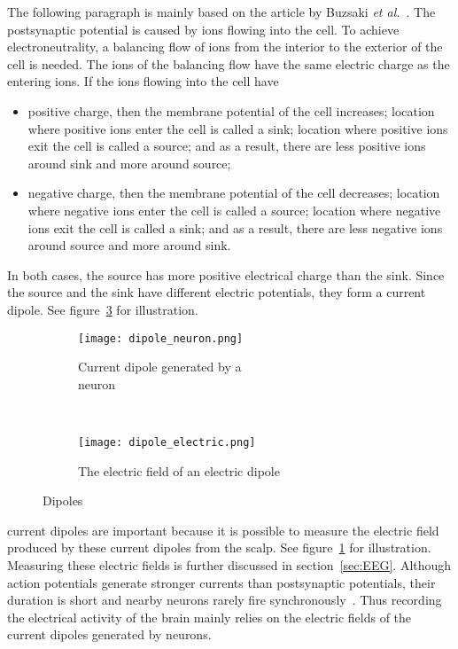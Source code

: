 The following paragraph is mainly based on the article by Buzsaki \textit{et al.}~\cite{electric_field}. The \gls{postsynaptic potential} is caused by ions flowing into the cell. To achieve electroneutrality, a balancing flow of ions from the interior to the exterior of the cell is needed. The ions of the balancing flow have the same electric charge as the entering ions. If the ions flowing into the cell have
\begin{itemize}
	\item positive charge, then 
	\subitem the \gls{membrane potential} of the cell increases;
	\subitem location where positive ions enter the cell is called a \gls{sink};
	\subitem location where positive ions exit the cell is called a \gls{source}; and
	\subitem as a result, there are less positive ions around \gls{sink} and more around \gls{source};
	\item negative charge, then
	\subitem the \gls{membrane potential} of the cell decreases;
	\subitem location where negative ions enter the cell is called a \gls{source};
	\subitem location where negative ions exit the cell is called a \gls{sink}; and
	\subitem as a result, there are less negative ions around \gls{source} and more around \gls{sink}.
\end{itemize}

In both cases, the \gls{source} has more positive electrical charge than the \gls{sink}. Since the \gls{source} and the \gls{sink} have different electric potentials, they form a \gls{current dipole}. See figure~\ref{fig:dipole} for illustration.

\begin{figure}[h!]
	\centering
	\begin{subfigure}{0.48\textwidth}
		\texttt{[image: dipole\_neuron.png]}
		\caption{Current dipole generated by a \\neuron~\cite[p.~669]{neuroscience}}
		\label{fig:dipole_neuron}
	\end{subfigure}
	~
	\begin{subfigure}{0.48\textwidth}
		\texttt{[image: dipole\_electric.png]}
		\caption{The electric field of an electric dipole\protect\footnotemark}
		\label{fig:dipole_electric}
	\end{subfigure}
	\caption{Dipoles}
	\label{fig:dipole}
\end{figure}

\Glspl{current dipole} are important because it is possible to measure the electric field produced by these \glspl{current dipole} from the scalp. See figure~\ref{fig:dipole_neuron} for illustration. Measuring these electric fields is further discussed in section~\ref{sec:EEG}. Although \glspl{action potential} generate stronger currents than \glspl{postsynaptic potential}, their duration is short and nearby \glspl{neuron} rarely fire synchronously~\cite{electric_field}. Thus recording the electrical activity of the brain mainly relies on the electric fields of the \glspl{current dipole} generated by \glspl{neuron}.

